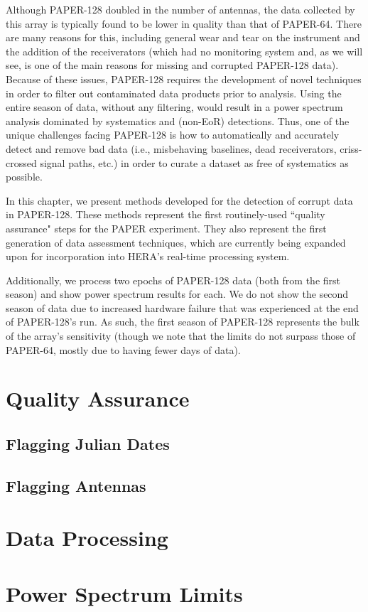 Although PAPER-128 doubled in the number of antennas, the data collected by this array is typically found to be lower in quality than that of PAPER-64. There are many reasons for this, including general wear and tear on the instrument and the addition of the receiverators (which had no monitoring system and, as we will see, is one of the main reasons for missing and corrupted PAPER-128 data). Because of these issues, PAPER-128 requires the development of novel techniques in order to filter out contaminated data products prior to analysis. Using the entire season of data, without any filtering, would result in a power spectrum analysis dominated by systematics and (non-EoR) detections. Thus, one of the unique challenges facing PAPER-128 is how to automatically and accurately detect and remove bad data (i.e., misbehaving baselines, dead receiverators, criss-crossed signal paths, etc.) in order to curate a dataset as free of systematics as possible.

In this chapter, we present methods developed for the detection of corrupt data in PAPER-128. These methods represent the first routinely-used ``quality assurance" steps for the PAPER experiment. They also represent the first generation of data assessment techniques, which are currently being expanded upon for incorporation into HERA's real-time processing system. 

Additionally, we process two epochs of PAPER-128 data (both from the first season) and show power spectrum results for each. We do not show the second season of data due to increased hardware failure that was experienced at the end of PAPER-128's run. As such, the first season of PAPER-128 represents the bulk of the array's sensitivity (though we note that the limits do not surpass those of PAPER-64, mostly due to having fewer days of data).

\section{Quality Assurance}
\subsection{Flagging Julian Dates}
\subsection{Flagging Antennas}
\section{Data Processing}
\section{Power Spectrum Limits}





